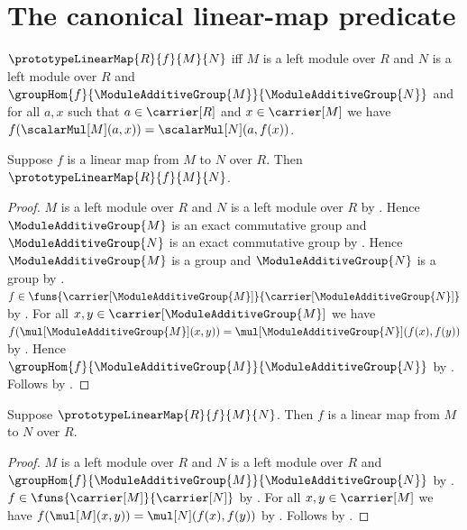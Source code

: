 



\section{The canonical linear-map predicate}

\begin{definition}\label{spike_prototype_linear_map}
    $\prototypeLinearMap{R}{f}{M}{N}$ iff
        $M$ is a left module over $R$ and
        $N$ is a left module over $R$ and
        $\groupHom{f}{\ModuleAdditiveGroup{M}}{
            \ModuleAdditiveGroup{N}}$ and
        for all $a,x$ such that
            $a\in\carrier[R]$ and
            $x\in\carrier[M]$ we have
            $f(\scalarMul[M](a,x))=\scalarMul[N](a,f(x))$.
\end{definition}

\begin{proposition}\label{spike_linear_map_implies_prototype}
    Suppose $f$ is a linear map from $M$ to $N$ over $R$.
    Then $\prototypeLinearMap{R}{f}{M}{N}$.
\end{proposition}
\begin{proof}
    $M$ is a left module over $R$ and
        $N$ is a left module over $R$ by .
    Hence $\ModuleAdditiveGroup{M}$ is an exact commutative group and
        $\ModuleAdditiveGroup{N}$ is an exact commutative group by
        .
    Hence $\ModuleAdditiveGroup{M}$ is a group and
        $\ModuleAdditiveGroup{N}$ is a group by
        .
    $f\in\funs{
        \carrier[\ModuleAdditiveGroup{M}]}{
        \carrier[\ModuleAdditiveGroup{N}]}$ by
        .
    For all $x,y\in\carrier[\ModuleAdditiveGroup{M}]$ we have
        $f(\mul[\ModuleAdditiveGroup{M}](x,y))
            =\mul[\ModuleAdditiveGroup{N}](f(x),f(y))$ by
        .
    Hence
        $\groupHom{f}{\ModuleAdditiveGroup{M}}{
            \ModuleAdditiveGroup{N}}$ by
        .
    Follows by .
\end{proof}

\begin{proposition}\label{spike_prototype_implies_linear_map}
    Suppose $\prototypeLinearMap{R}{f}{M}{N}$.
    Then $f$ is a linear map from $M$ to $N$ over $R$.
\end{proposition}
\begin{proof}
    $M$ is a left module over $R$ and
        $N$ is a left module over $R$ and
        $\groupHom{f}{\ModuleAdditiveGroup{M}}{
            \ModuleAdditiveGroup{N}}$ by
        .
    $f\in\funs{\carrier[M]}{\carrier[N]}$ by
        .
    For all $x,y\in\carrier[M]$ we have
        $f(\mul[M](x,y))=\mul[N](f(x),f(y))$ by
        .
    Follows by .
\end{proof}

